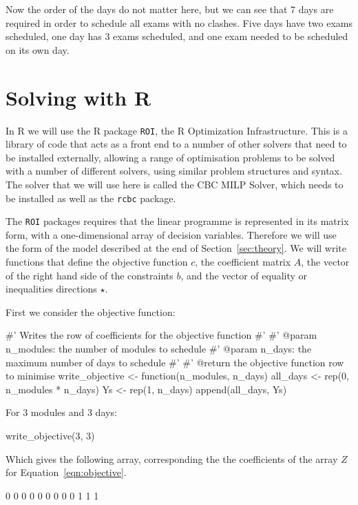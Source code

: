 Now the order of the days do not matter here, but we can see that 7 days are
required in order to schedule all exams with no clashes. Five days have two
exams scheduled, one day has 3 exams scheduled, and one exam needed to be
scheduled on its own day.


\section{Solving with R}\label{sec:solving-with-R}

In R we will use the R package \texttt{ROI}, the R Optimization
Infrastructure.
This is a library of code that acts as a front end to a number of other solvers
that need to be installed externally, allowing a range of optimisation problems
to be solved with a number of different solvers, using similar problem
structures and syntax.
The solver that we will use here is called the CBC MILP Solver, which needs to
be installed as well as the \texttt{rcbc} package.

The \texttt{ROI} packages requires that the linear programme is
represented in its matrix form, with a one-dimensional array of decision
variables. Therefore we will use the form of the model described at the end of
Section~\ref{sec:theory}.
We will write functions that define the objective function $c$, the coefficient
matrix $A$, the vector of the right hand side of the constraints $b$, and the
vector of equality or inequalities directions $\star$.

First we consider the objective function:

\begin{Rin-no-test}
#' Writes the row of coefficients for the objective function
#'
#' @param n_modules: the number of modules to schedule
#' @param n_days: the maximum number of days to schedule
#'
#' @return the objective function row to minimise
write_objective <- function(n_modules, n_days){
  all_days <- rep(0, n_modules * n_days)
  Ys <- rep(1, n_days)
  append(all_days, Ys)
}
\end{Rin-no-test}

For 3 modules and 3 days:

\begin{Rin-no-test}
write_objective(3, 3)
\end{Rin-no-test}

Which gives the following array, corresponding the the coefficients of the
array $Z$ for Equation~\ref{eqn:objective}.

\begin{Rout-no-test}
[1] 0 0 0 0 0 0 0 0 0 1 1 1
\end{Rout-no-test}

